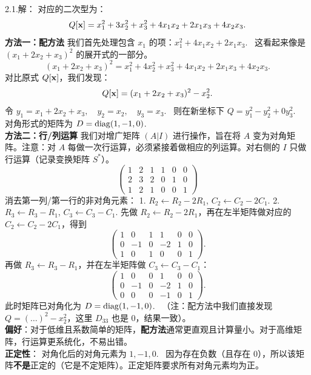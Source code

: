 \begin{exer}
2.1.解：
对应的二次型为：
$$ Q[\mathbf{x}] = x_1^2 + 3x_2^2 + x_3^2 + 4x_1x_2 + 2x_1x_3 + 4x_2x_3. $$
\textbf{方法一：配方法}
我们首先处理包含 $x_1$ 的项：$x_1^2 + 4x_1x_2 + 2x_1x_3$.~
这看起来像是 $(x_1 + 2x_2 + x_3)^2$ 的展开式的一部分。
$$ (x_1 + 2x_2 + x_3)^2 = x_1^2 + 4x_2^2 + x_3^2 + 4x_1x_2 + 2x_1x_3 + 4x_2x_3. $$
对比原式 $Q[\mathbf{x}]$，我们发现：
$$ Q[\mathbf{x}] = (x_1 + 2x_2 + x_3)^2 - x_2^2. $$
令 $y_1 = x_1 + 2x_2 + x_3, \quad y_2 = x_2, \quad y_3 = x_3$.~
则在新坐标下 $Q = y_1^2 - y_2^2 + 0y_3^2$.~
对角形式的矩阵为 $D = \operatorname{diag}(1, -1, 0)$.~
\\
\textbf{方法二：行/列运算}
我们对增广矩阵 $(A|I)$ 进行操作，旨在将 $A$ 变为对角矩阵。注意：对 $A$ 每做一次行运算，必须紧接着做相应的列运算。对右侧的 $I$ 只做行运算（记录变换矩阵 $S^*$）。
$$
\left(\begin{array}{ccc|ccc}
1 & 2 & 1 & 1 & 0 & 0 \\
2 & 3 & 2 & 0 & 1 & 0 \\
1 & 2 & 1 & 0 & 0 & 1
\end{array}\right)
$$
消去第一列/第一行的非对角元素：
1. $R_2 \leftarrow R_2 - 2R_1$, $C_2 \leftarrow C_2 - 2C_1$.
2. $R_3 \leftarrow R_3 - R_1$, $C_3 \leftarrow C_3 - C_1$.
先做 $R_2\leftarrow R_2-2R_1$，再在左半矩阵做对应的 $C_2\leftarrow C_2-2C_1$，得到
$$
\left(\begin{array}{ccc|ccc}
1 & 0 & 1 & 1 & 0 & 0 \\
0 & -1 & 0 & -2 & 1 & 0 \\
1 & 0 & 1 & 0 & 0 & 1
\end{array}\right).
$$
再做 $R_3\leftarrow R_3-R_1$，并在左半矩阵做 $C_3\leftarrow C_3-C_1$：
$$
\left(\begin{array}{ccc|ccc}
1 & 0 & 0 & 1 & 0 & 0 \\
0 & -1 & 0 & -2 & 1 & 0 \\
0 & 0 & 0 & -1 & 0 & 1
\end{array}\right).
$$
此时矩阵已对角化为 $D = \operatorname{diag}(1, -1, 0)$.~
（注：配方法中我们直接发现 $Q = (\dots)^2 - x_2^2$，这里 $D_{33}$ 也是 0，结果一致）。
\\
\textbf{偏好}：对于低维且系数简单的矩阵，\textbf{配方法}通常更直观且计算量小。对于高维矩阵，行运算更系统化，不易出错。
\\
\textbf{正定性}：
对角化后的对角元素为 $1, -1, 0$.~
因为存在负数（且存在 0），所以该矩阵\textbf{不是}正定的（它是不定矩阵）。正定矩阵要求所有对角元素均为正。


\end{exer}

